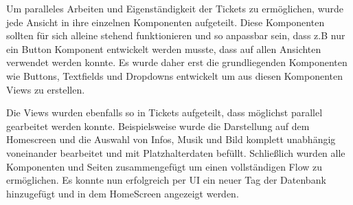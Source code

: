 \documentclass[10pt, a4paper]{article}
\begin{document}
\begin{onehalfspace}
Um paralleles Arbeiten und Eigenständigkeit der Tickets zu ermöglichen, wurde jede Ansicht in ihre einzelnen Komponenten aufgeteilt.
Diese Komponenten sollten für sich alleine stehend funktionieren und so anpassbar sein, dass z.B nur ein Button Komponent entwickelt werden musste, dass auf
allen Ansichten verwendet werden konnte. Es wurde daher erst die grundliegenden Komponenten wie Buttons, Textfields und Dropdowns entwickelt um aus diesen
Komponenten Views zu erstellen.

Die Views wurden ebenfalls so in Tickets aufgeteilt, dass möglichst parallel gearbeitet werden konnte.
Beispielsweise wurde die Darstellung auf dem Homescreen und die Auswahl von Infos, Musik und Bild komplett unabhängig voneinander bearbeitet und mit Platzhalterdaten befüllt.
Schließlich wurden alle Komponenten und Seiten zusammengefügt um einen vollständigen Flow zu ermöglichen.
Es konnte nun erfolgreich per UI ein neuer Tag der Datenbank hinzugefügt und in dem HomeScreen angezeigt werden.


\end{onehalfspace}
\end{document}
